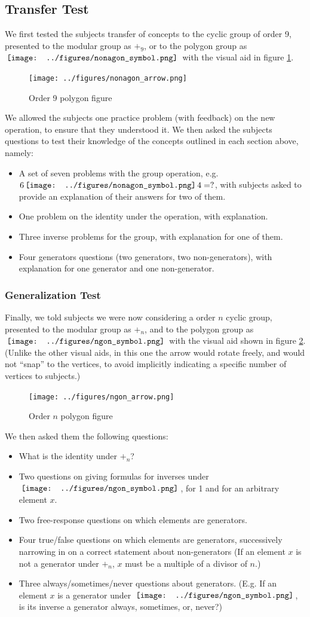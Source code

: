 \documentclass[11pt]{article}
\newcommand{\nonagon}{\,\vcenter{\hbox{\texttt{[image: ../figures/nonagon\_symbol.png]}}}\,}
\newcommand{\ngon}{\,\vcenter{\hbox{\texttt{[image: ../figures/ngon\_symbol.png]}}}\,}
\begin{document}
\subsection{Transfer Test}
We first tested the subjects transfer of concepts to the cyclic group of order 9, presented to the modular group as $+_9$, or to the polygon group as $\nonagon$ with the visual aid in figure \ref{nonagonex}. 
\begin{figure}[H] \centering \texttt{[image: ../figures/nonagon\_arrow.png]} \caption{Order 9 polygon figure} \label{nonagonex} \end{figure} \noindent
We allowed the subjects one practice problem (with feedback) on the new operation, to ensure that they understood it. We then asked the subjects questions to test their knowledge of the concepts outlined in each section above, namely:
\begin{itemize} 
\item A set of seven problems with the group operation, e.g. $6 \nonagon 4 = ?$, with subjects asked to provide an explanation of their answers for two of them.
\item One problem on the identity under the operation, with explanation.
\item Three inverse problems for the group, with explanation for one of them.
\item Four generators questions (two generators, two non-generators), with explanation for one generator and one non-generator.
\end{itemize}
\subsubsection{Generalization Test}
Finally, we told subjects we were now considering a order $n$ cyclic group, presented to the modular group as $+_n$, and to the polygon group as $\ngon$ with the visual aid shown in figure \ref{ngonex}. (Unlike the other visual aids, in this one the arrow would rotate freely, and would not ``snap'' to the vertices, to avoid implicitly indicating a specific number of vertices to subjects.) 
\begin{figure}[H] \centering \texttt{[image: ../figures/ngon\_arrow.png]} \caption{Order $n$ polygon figure} \label{ngonex} \end{figure} \noindent
We then asked them the following questions: 
\begin{itemize}
\item What is the identity under $+_n$?
\item Two questions on giving formulas for inverses under $\ngon$, for 1 and for an arbitrary element $x$.
\item Two free-response questions on which elements are generators. 
\item Four true/false questions on which elements are generators, successively narrowing in on a correct statement about non-generators (If an element $x$ is not a generator under $+_n$, $x$ must be a multiple of a divisor of $n$.)
\item Three always/sometimes/never questions about generators. (E.g. If an element $x$ is a generator under $\ngon$, is its inverse a generator always, sometimes, or, never?) 
\end{itemize}
\end{document}
